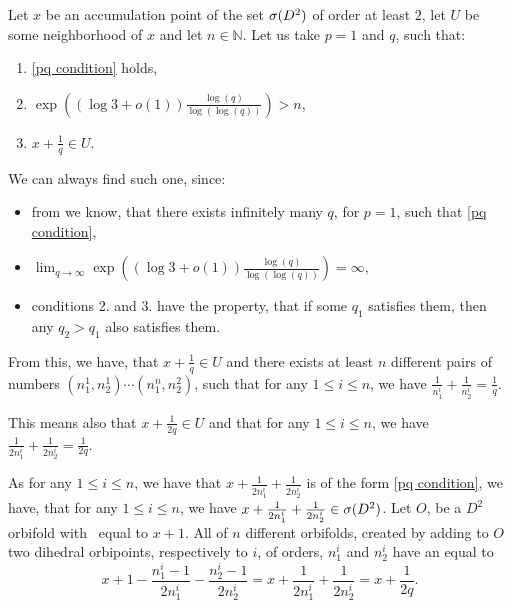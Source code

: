 Let $x$ be an accumulation point of the set ${{\sigma}(D^2)}$ of order at least $2$, let $U$ be 
some neighborhood of $x$ and let $n \in \mathbb{N}$. Let us take $p = 1$ and $q$, such that:
\begin{enumerate} \label{choice for q}
\item \ref{pq condition} holds, 
\item$\exp\left((\log{3}+o(1))\frac{\log(q)}{\log(\log(q))}\right) > n$,
\item $x + \frac{1}{q} \in U$. 
\end{enumerate}
We can always find such one, since:
\begin{itemize} 
\item from \cite{Browning2011} we know, that there exists 
infinitely many $q$, for $p = 1$, such that \ref{pq condition}, 
\item
$\lim_{q \to \infty }\exp\left((\log{3}+o(1))\frac{\log(q)}{\log(\log(q))}\right) = \infty$,
\item conditions 2. and 3. have the property, that if some $q_1$ satisfies them, 
then any $q_2 > q_1$ also satisfies them. 
\end{itemize}
From this, we have, that $x + \frac{1}{q} \in U$ and there exists at least $n$ different pairs of numbers $(n_1^1, n_2^1)\cdots (n_1^n, n_2^2)$, such that for any $1 \leq i \leq n$, we have 
$\frac{1}{n_1^i}+\frac{1}{n_2^i} = \frac{1}{q}$. 

This means also that $x + \frac{1}{2q} \in U$ and that for any $1 \leq i \leq n$, we have 
$\frac{1}{2n_1^i}+\frac{1}{2n_2^i} = \frac{1}{2q}$. 

As for any $1 \leq i \leq n$, we have that  $x + \frac{1}{2n_1^i}+\frac{1}{2n_2^i}$ 
is of the form \ref{pq condition}, we have, that for any $1 \leq i \leq n$, we have 
$x + \frac{1}{2n_1^i}+\frac{1}{2n_2^i} \in {{\sigma}(D^2)}$. 
Let $O$, be a $D^2$ orbifold with 
\Eoc\ equal to $x+1$. All of $n$ different orbifolds, created by adding to $O$ two dihedral 
orbipoints, respectively to $i$, of orders, $n_1^i$ and $n_2^i$ have an \Eoc equal to 
\begin{equation}
x + 1 - \frac{n_1^i-1}{2n_1^i} - \frac{n_2^i-1}{2n_2^i} = 
x + \frac{1}{2n_1^i} + \frac{1}{2n_2^i} = x + \frac{1}{2q}.
\end{equation} 

